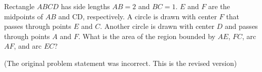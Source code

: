 Rectangle $ABCD$ has side lengths $AB = 2$ and $BC = 1$. $E$ and $F$ are the midpoints of $AB$ and CD, respectively. A circle is drawn with center $F$ that passes through points $E$ and $C$. Another circle is drawn with center $D$ and passes through points $A$ and $F$. What is the area of the region bounded by $AE$, $FC$, arc $AF$, and arc $EC$?

(The original problem statement was incorrect. This is the revised version)
